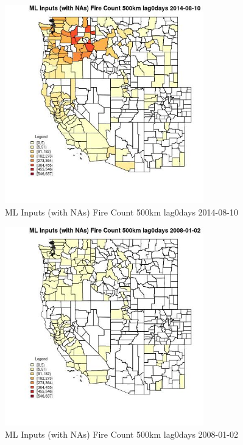 \begin{figure} 
\centering  
\includegraphics[width=0.77\textwidth]{Code_Outputs/Report_ML_input_PM25_Step4_part_e_de_duplicated_aves_compiled_2019-05-18wNAs_CountyFire_Count_500km_lag0daysMean2014-08-10.jpg} 
\caption{\label{fig:Report_ML_input_PM25_Step4_part_e_de_duplicated_aves_compiled_2019-05-18wNAsCountyFire_Count_500km_lag0daysMean2014-08-10}ML Inputs (with NAs) Fire Count 500km lag0days 2014-08-10} 
\end{figure} 
 

\clearpage 

\begin{figure} 
\centering  
\includegraphics[width=0.77\textwidth]{Code_Outputs/Report_ML_input_PM25_Step4_part_e_de_duplicated_aves_compiled_2019-05-18wNAs_CountyFire_Count_500km_lag0daysMean2008-01-02.jpg} 
\caption{\label{fig:Report_ML_input_PM25_Step4_part_e_de_duplicated_aves_compiled_2019-05-18wNAsCountyFire_Count_500km_lag0daysMean2008-01-02}ML Inputs (with NAs) Fire Count 500km lag0days 2008-01-02} 
\end{figure} 
 

